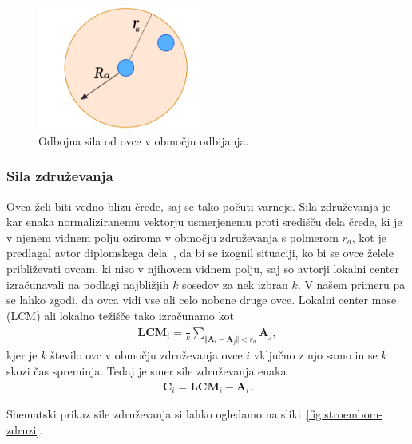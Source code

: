 \begin{figure}[ht]  %
	\centering
	\includegraphics[width=0.49\textwidth]{../poglavja/images/stroembom_odboj.pdf}
	\caption[Odbojna sila]{Odbojna sila od ovce v območju odbijanja.} %
	\label{fig:stroembom-odboj}
\end{figure}

\subsubsection{Sila združevanja}

Ovca želi biti vedno blizu črede, saj se tako počuti varneje. Sila združevanja je kar enaka normaliziranemu vektorju usmerjenemu proti središču dela črede, ki je v njenem vidnem polju oziroma v območju združevanja s polmerom $r_d$, kot je predlagal avtor diplomskega dela~\cite{diplomska}, da bi se izognil situaciji, ko bi se ovce želele približevati ovcam, ki niso v njihovem vidnem polju, saj so avtorji lokalni center izračunavali na podlagi najbližjih $k$ sosedov za nek izbran $k$. V našem primeru pa se lahko zgodi, da ovca vidi vse ali celo nobene druge ovce. Lokalni center mase (LCM) ali lokalno težišče tako izračunamo kot
\begin{align}
\mathbf{LCM}_i = \frac{1}{k}\sum_{\Vert \mathbf{A}_i - \mathbf{A}_j\Vert < r_d} \mathbf{A}_j, \label{eq:stroembom-lcm}
\end{align}
kjer je $k$ število ovc v območju združevanja ovce $i$ vključno z njo samo in se $k$ skozi čas spreminja. Tedaj je smer sile združevanja enaka
\begin{align}
\mathbf{C}_i = \mathbf{LCM}_i - \mathbf{A}_i. \label{eq:stroembom-zdruzi}
\end{align}

Shematski prikaz sile združevanja si lahko ogledamo na sliki~\ref{fig:stroembom-zdruzi}.


